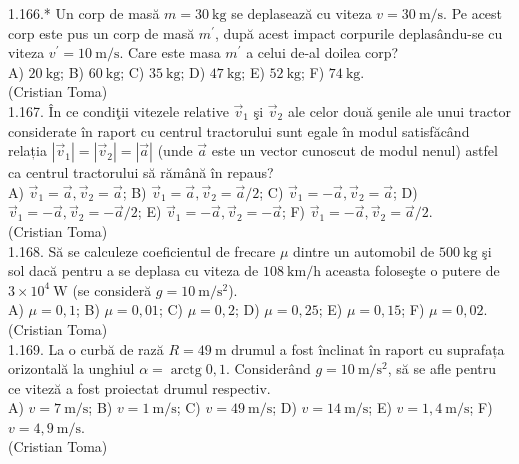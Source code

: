 1.166.* Un corp de masă $m=30 \mathrm{~kg}$ se deplasează cu viteza $v=30 \mathrm{~m} / \mathrm{s}$. Pe acest corp este pus un corp de masă $m^{\prime}$, după acest impact corpurile deplasându-se cu viteza $v^{\prime}=10 \mathrm{~m} / \mathrm{s}$. Care este masa $m^{\prime}$ a celui de-al doilea corp?\\ A) $20 \mathrm{~kg}$; B) $60 \mathrm{~kg}$; C) $35 \mathrm{~kg}$; D) $47 \mathrm{~kg}$; E) $52 \mathrm{~kg}$; F) $74 \mathrm{~kg}$.\\ (Cristian Toma)\\

1.167. În ce condiţii vitezele relative $\vec{v}_{1}$ şi $\vec{v}_{2}$ ale celor două şenile ale unui tractor considerate în raport cu centrul tractorului sunt egale în modul satisfăcând relația $\left|\vec{v}_{1}\right|=\left|\vec{v}_{2}\right|=|\vec{a}|$ (unde $\vec{a}$ este un vector cunoscut de modul nenul) astfel ca centrul tractorului să rămână în repaus?\\ A) $\vec{v}_{1}=\vec{a}, \vec{v}_{2}=\vec{a}$; B) $\vec{v}_{1}=\vec{a}, \vec{v}_{2}=\vec{a} / 2$; C) $\vec{v}_{1}=-\vec{a}, \vec{v}_{2}=\vec{a}$; D) $\vec{v}_{1}=-\vec{a}, \vec{v}_{2}=-\vec{a} / 2$; E) $\vec{v}_{1}=-\vec{a}, \vec{v}_{2}=-\vec{a}$; F) $\vec{v}_{1}=-\vec{a}, \vec{v}_{2}=\vec{a} / 2$.\\ (Cristian Toma)\\

1.168. Să se calculeze coeficientul de frecare $\mu$ dintre un automobil de $500 \mathrm{~kg}$ şi sol dacă pentru a se deplasa cu viteza de $108 \mathrm{~km} / \mathrm{h}$ aceasta foloseşte o putere de $3 \times 10^{4} \mathrm{~W}$ (se consideră $g=10 \mathrm{~m} / \mathrm{s}^{2}$).\\ A) $\mu=0,1$; B) $\mu=0,01$; C) $\mu=0,2$; D) $\mu=0,25$; E) $\mu=0,15$; F) $\mu=0,02$.\\ (Cristian Toma)\\

1.169. La o curbă de rază $R=49 \mathrm{~m}$ drumul a fost înclinat în raport cu suprafața orizontală la unghiul $\alpha=\operatorname{arctg} 0,1$. Considerând $g=10 \mathrm{~m} / \mathrm{s}^{2}$, să se afle pentru ce viteză a fost proiectat drumul respectiv.\\ A) $v=7 \mathrm{~m} / \mathrm{s}$; B) $v=1 \mathrm{~m} / \mathrm{s}$; C) $v=49 \mathrm{~m} / \mathrm{s}$; D) $v=14 \mathrm{~m} / \mathrm{s}$; E) $v=1,4 \mathrm{~m} / \mathrm{s}$; F) $v=4,9 \mathrm{~m} / \mathrm{s}$.\\ (Cristian Toma)\\

